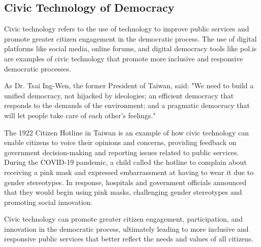\documentclass{IEEEtran}
\begin{document}
\subsection{Civic Technology of Democracy}

Civic technology refers to the use of technology to improve public services and promote greater citizen engagement in the democratic process. The use of digital platforms like social media, online forums, and digital democracy tools like pol.is are examples of civic technology that promote more inclusive and responsive democratic processes.

As Dr. Tsai Ing-Wen, the former President of Taiwan, said: "We need to build a unified democracy, not hijacked by ideologies; an efficient democracy that responds to the demands of the environment; and a pragmatic democracy that will let people take care of each other's feelings."

The 1922 Citizen Hotline in Taiwan is an example of how civic technology can enable citizens to voice their opinions and concerns, providing feedback on government decision-making and reporting issues related to public services. During the COVID-19 pandemic, a child called the hotline to complain about receiving a pink mask and expressed embarrassment at having to wear it due to gender stereotypes. In response, hospitals and government officials announced that they would begin using pink masks, challenging gender stereotypes and promoting social innovation.

Civic technology can promote greater citizen engagement, participation, and innovation in the democratic process, ultimately leading to more inclusive and responsive public services that better reflect the needs and values of all citizens.


\end{document}
